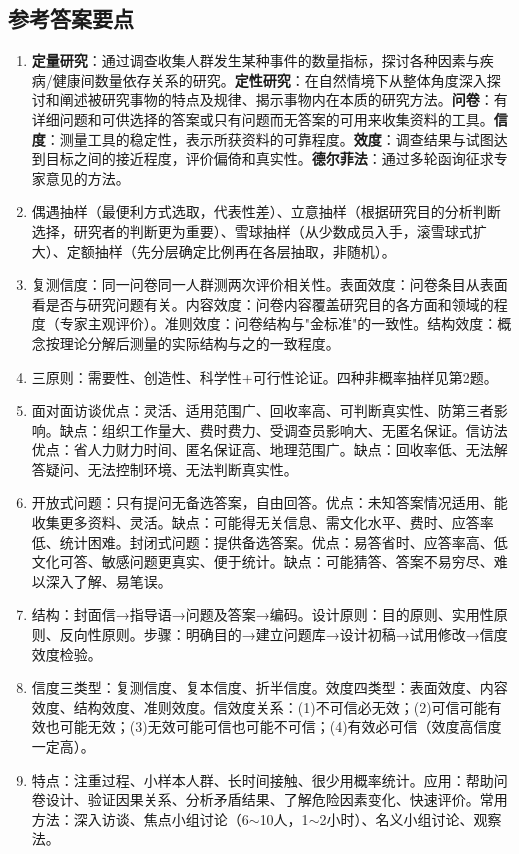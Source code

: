 \subsection*{参考答案要点}

\begin{enumerate}[leftmargin=*, itemsep=5pt]
    \item \textbf{定量研究}：通过调查收集人群发生某种事件的数量指标，探讨各种因素与疾病/健康间数量依存关系的研究。\textbf{定性研究}：在自然情境下从整体角度深入探讨和阐述被研究事物的特点及规律、揭示事物内在本质的研究方法。\textbf{问卷}：有详细问题和可供选择的答案或只有问题而无答案的可用来收集资料的工具。\textbf{信度}：测量工具的稳定性，表示所获资料的可靠程度。\textbf{效度}：调查结果与试图达到目标之间的接近程度，评价偏倚和真实性。\textbf{德尔菲法}：通过多轮函询征求专家意见的方法。
    \item 偶遇抽样（最便利方式选取，代表性差）、立意抽样（根据研究目的分析判断选择，研究者的判断更为重要）、雪球抽样（从少数成员入手，滚雪球式扩大）、定额抽样（先分层确定比例再在各层抽取，非随机）。
    \item 复测信度：同一问卷同一人群测两次评价相关性。表面效度：问卷条目从表面看是否与研究问题有关。内容效度：问卷内容覆盖研究目的各方面和领域的程度（专家主观评价）。准则效度：问卷结构与"金标准"的一致性。结构效度：概念按理论分解后测量的实际结构与之的一致程度。
    \item 三原则：需要性、创造性、科学性+可行性论证。四种非概率抽样见第2题。
    \item 面对面访谈优点：灵活、适用范围广、回收率高、可判断真实性、防第三者影响。缺点：组织工作量大、费时费力、受调查员影响大、无匿名保证。信访法优点：省人力财力时间、匿名保证高、地理范围广。缺点：回收率低、无法解答疑问、无法控制环境、无法判断真实性。
    \item 开放式问题：只有提问无备选答案，自由回答。优点：未知答案情况适用、能收集更多资料、灵活。缺点：可能得无关信息、需文化水平、费时、应答率低、统计困难。封闭式问题：提供备选答案。优点：易答省时、应答率高、低文化可答、敏感问题更真实、便于统计。缺点：可能猜答、答案不易穷尽、难以深入了解、易笔误。
    \item 结构：封面信→指导语→问题及答案→编码。设计原则：目的原则、实用性原则、反向性原则。步骤：明确目的→建立问题库→设计初稿→试用修改→信度效度检验。
    \item 信度三类型：复测信度、复本信度、折半信度。效度四类型：表面效度、内容效度、结构效度、准则效度。信效度关系：(1)不可信必无效；(2)可信可能有效也可能无效；(3)无效可能可信也可能不可信；(4)有效必可信（效度高信度一定高）。
    \item 特点：注重过程、小样本人群、长时间接触、很少用概率统计。应用：帮助问卷设计、验证因果关系、分析矛盾结果、了解危险因素变化、快速评价。常用方法：深入访谈、焦点小组讨论（6$\sim$10人，1$\sim$2小时）、名义小组讨论、观察法。
\end{enumerate}

\newpage
